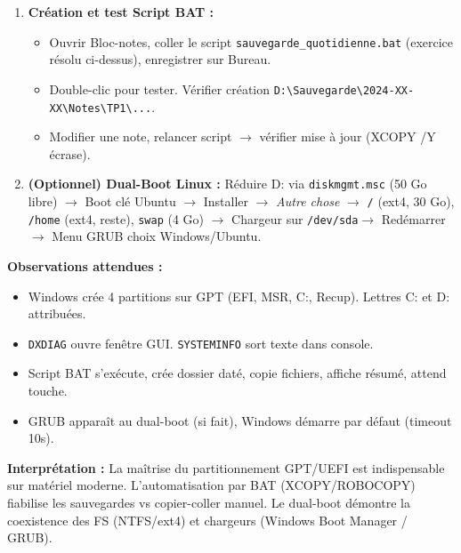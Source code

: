 \documentclass[11pt]{article}
\begin{document}
\begin{experience}
\begin{enumerate}
\begin{itemize}
        \end{itemize}
  \item \textbf{Création et test Script BAT :}
        \begin{itemize}
          \item Ouvrir Bloc-notes, coller le script \texttt{sauvegarde\_quotidienne.bat} (exercice résolu ci-dessus), enregistrer sur Bureau.
          \item Double-clic pour tester. Vérifier création \texttt{D:\textbackslash Sauvegarde\textbackslash 2024-XX-XX\textbackslash Notes\textbackslash TP1\textbackslash ...}.
          \item Modifier une note, relancer script $\rightarrow$ vérifier mise à jour (XCOPY /Y écrase).
        \end{itemize}
  \item \textbf{(Optionnel) Dual-Boot Linux :} Réduire D: via \texttt{diskmgmt.msc} (50 Go libre) $\rightarrow$ Boot clé Ubuntu $\rightarrow$ Installer $\rightarrow$ \emph{Autre chose} $\rightarrow$ \texttt{/} (ext4, 30 Go), \texttt{/home} (ext4, reste), \texttt{swap} (4 Go) $\rightarrow$ Chargeur sur \texttt{/dev/sda}$\rightarrow$ Redémarrer $\rightarrow$ Menu GRUB choix Windows/Ubuntu.
\end{enumerate}

\textbf{Observations attendues :}
\begin{itemize}
  \item Windows crée 4 partitions sur GPT (EFI, MSR, C:, Recup). Lettres C: et D: attribuées.
  \item \texttt{DXDIAG} ouvre fenêtre GUI. \texttt{SYSTEMINFO} sort texte dans console.
  \item Script BAT s'exécute, crée dossier daté, copie fichiers, affiche résumé, attend touche.
  \item GRUB apparaît au dual-boot (si fait), Windows démarre par défaut (timeout 10s).
\end{itemize}

\textbf{Interprétation :} La maîtrise du partitionnement GPT/UEFI est indispensable sur matériel moderne. L'automatisation par BAT (XCOPY/ROBOCOPY) fiabilise les sauvegardes vs copier-coller manuel. Le dual-boot démontre la coexistence des FS (NTFS/ext4) et chargeurs (Windows Boot Manager / GRUB).
\end{experience}
\end{document}
